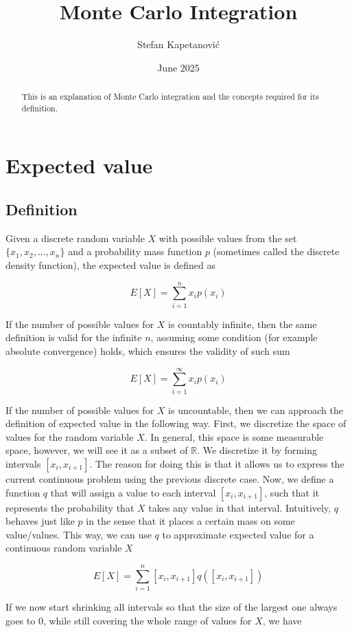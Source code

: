\documentclass{article}
\title{Monte Carlo Integration}
\author{Stefan Kapetanović}
\date{June 2025}
\begin{document}
\maketitle

\begin{abstract}
This is an explanation of Monte Carlo integration and the concepts required for its definition.
\end{abstract}

\section{Expected value}

\subsection{Definition}

Given a discrete random variable $X$ with possible values from the set $\{x_1, x_2, ..., x_n\}$ and a probability mass function $p$ (sometimes called the discrete density function), the expected value is defined as

\[ E[X] = \sum_{i=1}^{n} x_i p(x_i) \]

If the number of possible values for $X$ is countably infinite, then the same definition is valid for the infinite $n$, assuming some condition (for example absolute convergence) holds, which ensures the validity of such sum

\[ E[X] = \sum_{i=1}^{\infty} x_i p(x_i) \]

If the number of possible values for $X$ is uncountable, then we can approach the definition of expected value in the following way. First, we discretize the space of values for the random variable $X$. In general, this space is some measurable space, however, we will see it as a subset of $\mathbb{R}$. We discretize it by forming intervals $[x_i, x_{i+1}]$. The reason for doing this is that it allows us to express the current continuous problem using the previous discrete case. Now, we define a function $q$ that will assign a value to each interval $[x_i, x_{i+1}]$, such that it represents the probability that $X$ takes any value in that interval. Intuitively, $q$ behaves just like $p$ in the sense that it places a certain mass on some value/values. This way, we can use $q$ to approximate expected value for a continuous random variable $X$

\[ E[X] = \sum_{i=1}^n [x_i, x_{i+1}]q([x_i, x_{i+1}]) \]

If we now start shrinking all intervals so that the size of the largest one always goes to 0, while still covering the whole range of values for $X$, we have
\end{document}
